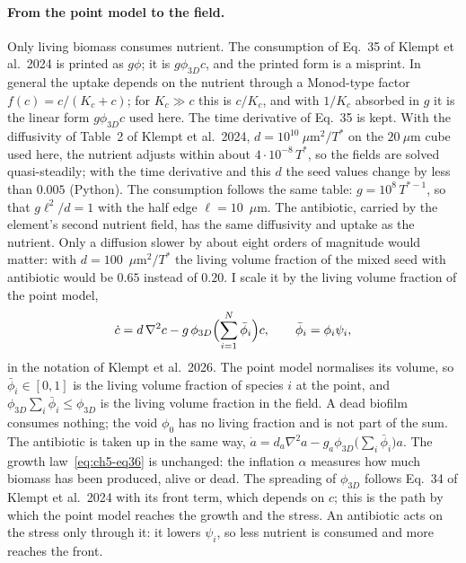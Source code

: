 \paragraph{From the point model to the field.}
Only living biomass consumes nutrient. The consumption of Eq.~35 of Klempt et al.\ 2024 is printed as
$g\phi$; it is $g\phi_{3D}c$, and the printed form is a misprint.
In general the uptake depends on the nutrient through a Monod-type factor $f(c)=c/(K_c+c)$; for
$K_c\gg c$ this is $c/K_c$, and with $1/K_c$ absorbed in $g$ it is the linear form $g\phi_{3D}c$ used here.
The time derivative of Eq.~35 is kept. With the diffusivity of Table~2 of Klempt et al.\ 2024, $d=10^{10}~\mu$m$^2/T^*$
on the $20~\mu$m cube used here, the nutrient adjusts within
about $4\cdot10^{-8}\,T^*$, so the fields are solved quasi-steadily; with the time derivative and this $d$ the seed values
change by less than $0.005$ (Python). The consumption follows the same table: $g=10^8\,T^{*-1}$, so that $g\ell^2/d=1$ with the half edge
$\ell=10$~$\mu$m. The antibiotic, carried by the element's second nutrient field, has the same diffusivity and uptake as the nutrient. Only a diffusion
slower by about eight orders of magnitude would matter: with $d=100$~$\mu$m$^2/T^*$ the living volume fraction of the mixed
seed with antibiotic would be $0.65$ instead of $0.20$.
I scale it by the living volume
fraction of the point model,
\begin{equation}
\dot c=d\,\nabla^2c-g\,\phi_{3D}\Bigl(\sum_{i=1}^N\bar\phi_i\Bigr)c,\qquad \bar\phi_i=\phi_i\psi_i,
\label{eq:ch5-consumption}
\end{equation}
in the notation of Klempt et al.\ 2026. The point model normalises its volume, so $\bar\phi_i\in[0,1]$
is the living volume fraction of species $i$ at the point, and $\phi_{3D}\sum_i\bar\phi_i\le\phi_{3D}$
is the living volume fraction in the field. A dead biofilm consumes nothing; the void $\phi_0$ has no
living fraction and is not part of the sum. The antibiotic is taken up in the same way,
$\dot a=d_a\nabla^2a-g_a\phi_{3D}\bigl(\sum_i\bar\phi_i\bigr)a$. The growth law~\eqref{eq:ch5-eq36} is
unchanged: the inflation $\alpha$ measures how much biomass has been produced, alive or dead. The
spreading of $\phi_{3D}$ follows Eq.~34 of Klempt et al.\ 2024 with its front term, which depends on
$c$; this is the path by which the point model reaches the growth and the stress. An antibiotic acts on
the stress only through it: it lowers $\psi_i$, so less nutrient is consumed and more reaches the front.

